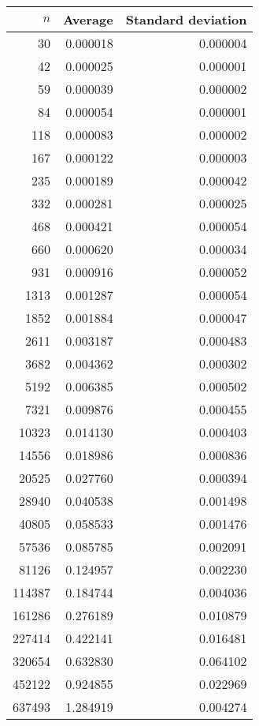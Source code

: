 \begin{tabular}{rrr}
$n$ & Average & Standard deviation\\\hline
30 & 0.000018 & 0.000004\\
42 & 0.000025 & 0.000001\\
59 & 0.000039 & 0.000002\\
84 & 0.000054 & 0.000001\\
118 & 0.000083 & 0.000002\\
167 & 0.000122 & 0.000003\\
235 & 0.000189 & 0.000042\\
332 & 0.000281 & 0.000025\\
468 & 0.000421 & 0.000054\\
660 & 0.000620 & 0.000034\\
931 & 0.000916 & 0.000052\\
1313 & 0.001287 & 0.000054\\
1852 & 0.001884 & 0.000047\\
2611 & 0.003187 & 0.000483\\
3682 & 0.004362 & 0.000302\\
5192 & 0.006385 & 0.000502\\
7321 & 0.009876 & 0.000455\\
10323 & 0.014130 & 0.000403\\
14556 & 0.018986 & 0.000836\\
20525 & 0.027760 & 0.000394\\
28940 & 0.040538 & 0.001498\\
40805 & 0.058533 & 0.001476\\
57536 & 0.085785 & 0.002091\\
81126 & 0.124957 & 0.002230\\
114387 & 0.184744 & 0.004036\\
161286 & 0.276189 & 0.010879\\
227414 & 0.422141 & 0.016481\\
320654 & 0.632830 & 0.064102\\
452122 & 0.924855 & 0.022969\\
637493 & 1.284919 & 0.004274\\
\end{tabular}
